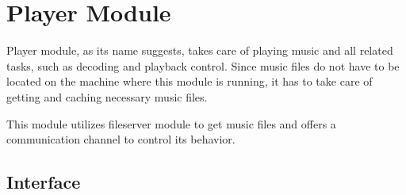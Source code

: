 \section {Player Module}

Player module, as its name suggests, takes care of playing music and all related tasks, such as decoding and playback control. Since music files do not have to be located on the machine where this module is running, it has to take care of getting and caching necessary music files.
\par
This module utilizes fileserver module to get music files and offers a communication channel to control its behavior.

\subsection{Interface}

